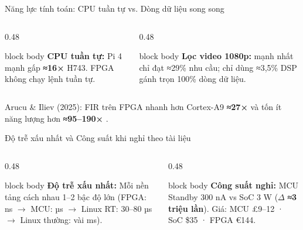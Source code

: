\begin{frame}{Năng lực tính toán: CPU tuần tự vs. Dòng dữ liệu song song}
\begin{columns}[T]
\begin{column}{0.48\linewidth}\centering
{}
\vspace{-4pt}
\begin{beamercolorbox}[rounded=true,sep=3pt]{block body}\scriptsize
\textbf{CPU tuần tự:} \SoC{} Pi 4 mạnh gấp \textbf{≈16×} \MCU{} H743. FPGA không chạy lệnh tuần tự.
\end{beamercolorbox}
\end{column}
\begin{column}{0.48\linewidth}\centering
{}
\vspace{-4pt}
\begin{beamercolorbox}[rounded=true,sep=3pt]{block body}\scriptsize
\textbf{Lọc video 1080p:} \MCU{} mạnh nhất chỉ đạt ≈29\% nhu cầu; \FPGA{} chỉ dùng ≈3,5\% DSP gánh trọn 100\% dòng dữ liệu.
\end{beamercolorbox}
\end{column}
\end{columns}
\vfill
\scriptsize\centering\textcolor{cInk2}{Arucu \& Iliev (2025): FIR trên FPGA nhanh hơn Cortex-A9 \textbf{≈27×} và tốn ít năng lượng hơn \textbf{≈95–190×} .}
\end{frame}

\begin{frame}{Độ trễ xấu nhất và Công suất khi nghỉ theo tài liệu}
\begin{columns}[T]
\begin{column}{0.48\linewidth}\centering
{}
\vspace{-4pt}
\begin{beamercolorbox}[rounded=true,sep=3pt]{block body}\scriptsize
\textbf{Độ trễ xấu nhất:} Mỗi nền tảng cách nhau 1–2 bậc độ lớn (FPGA: ns $\rightarrow$ MCU: µs $\rightarrow$ Linux RT: 30–80 µs $\rightarrow$ Linux thường: vài ms).
\end{beamercolorbox}
\end{column}
\begin{column}{0.48\linewidth}\centering
{}
\vspace{-4pt}
\begin{beamercolorbox}[rounded=true,sep=3pt]{block body}\scriptsize
\textbf{Công suất nghỉ:} MCU Standby 300 nA vs SoC 3 W ($\Delta$ \textbf{≈3 triệu lần}). Giá: MCU £9–12 · SoC \$35 · FPGA €144.
\end{beamercolorbox}
\end{column}
\end{columns}
\end{frame}

